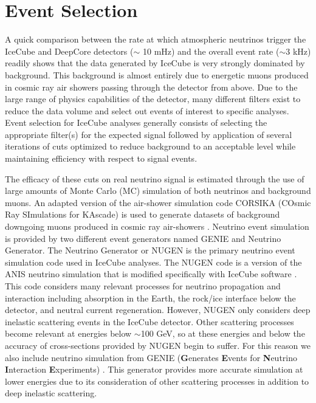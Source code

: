 \documentclass{gatech-thesis}
\begin{document}
\chapter{Event Selection}
A quick comparison between the rate at which atmospheric neutrinos trigger the IceCube and DeepCore detectors ($\sim$ 10 mHz) and the overall event rate ($\sim 3$ kHz) readily shows that the data generated by IceCube is very strongly dominated by background. This background is almost entirely due to energetic muons produced in cosmic ray air showers passing through the detector from above. Due to the large range of physics capabilities of the detector, many different filters exist to reduce the data volume and select out events of interest to specific analyses. Event selection for IceCube analyses generally consists of selecting the appropriate filter(s) for the expected signal followed by application of several iterations of cuts optimized to reduce background to an acceptable level while maintaining efficiency with respect to signal events.

The efficacy of these cuts on real neutrino signal is estimated through the use of large amounts of Monte Carlo (MC) simulation of both neutrinos and background muons. An adapted version of the air-shower simulation code CORSIKA (COsmic Ray SImulations for KAscade) is used to generate datasets of background downgoing  muons produced in cosmic ray air-showers \cite{1998cmcc.book.....H}.  Neutrino event simulation is provided by two different event generators named GENIE and Neutrino Generator. The Neutrino Generator or NUGEN is the primary neutrino event simulation code used in IceCube analyses. The NUGEN code is a version of the ANIS neutrino simulation that is modified specifically with IceCube software \cite{2005CoPhC.172..203G}. This code considers many relevant processes for neutrino propagation and interaction including absorption in the Earth, the rock/ice interface below the detector, and neutral current regeneration. However, NUGEN only considers deep inelastic scattering events in the IceCube detector. Other scattering processes become relevant at energies below $\sim$100 GeV, so at these energies and below the accuracy of cross-sections provided by NUGEN begin to suffer. For this reason we also include neutrino simulation from GENIE (\textbf{G}enerates \textbf{E}vents for \textbf{N}eutrino \textbf{I}nteraction \textbf{E}xperiments) \cite{2010NIMPA.614...87A}. This generator provides more accurate simulation at lower energies due to its consideration of other scattering processes in addition to deep inelastic scattering.
\end{document}
